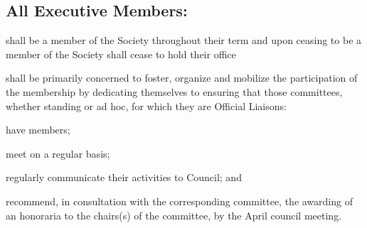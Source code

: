 \subsection [The Executive (General)]{All Executive Members:}
\begin{longenum}[ label*=\thesection.\arabic*., align=left]
	\item shall be a member of the Society throughout their term and upon ceasing to be a member of the Society shall cease to hold their office
    \item shall be primarily concerned to foster, organize and mobilize the participation of the membership by dedicating themselves to ensuring that those committees, whether standing  or ad hoc, for which they are Official Liaisons:
   \begin{longenum}[ label*=\arabic*., align=left]
		\item have members;
   		\item meet on a regular basis;
        \item regularly communicate their activities to Council; and
   		\item recommend, in consultation with the corresponding committee, the awarding of an honoraria to the chairs(s) of the committee, by the April council meeting.  
   		
	\end{longenum}
	

\end{longenum}
